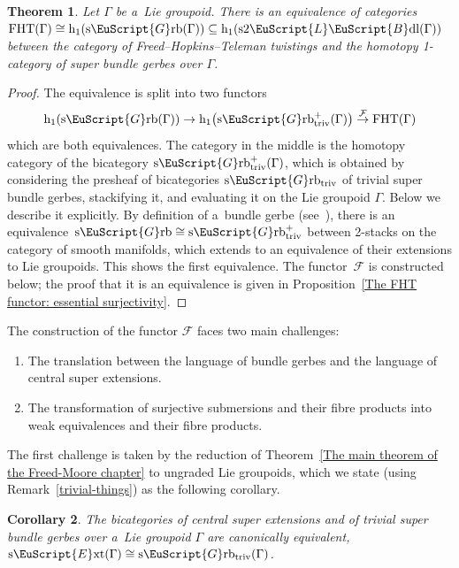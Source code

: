 \documentclass[pdftex]{sigma}
\numberwithin{equation}{section}
\newtheorem{Theorem}{Theorem}[section]
\newtheorem{Corollary}[Theorem]{Corollary}
\def\mathscr#1{\EuScript{#1}}
\def\hc#1{\mathrm{h}_{#1}}
\def\subset{\subseteq}
\newcommand{\LineBdl}{\mathscr{L}\mathscr{B}\mathrm{dl}}
\newcommand{\stwoLineBdl}{\mathrm{s}2\LineBdl}
\newcommand{\Grb}{\mathscr{G}\mathrm{rb}}
\newcommand{\Grbtriv}{\mathscr{G}\mathrm{rb}_{\mathrm{triv}}}
\newcommand{\sGrb}{\mathrm{s}\Grb}
\newcommand{\sGrbtriv}{\mathrm{s}\Grbtriv}
\def\sExt{\normalfont\text{s}\mathscr{E}\text{xt}}
\begin{document}
\begin{Theorem}
\label{The main theorem of the Freed Hopkins Teleman chapter}
 Let $\Gamma$ be a~Lie groupoid. There is an equivalence of categories
$
\mathrm{FHT}(\Gamma) \cong \hc 1(\sGrb(\Gamma))\subset \hc 1(\stwoLineBdl(\Gamma))
$
between the category of Freed--Hopkins--Teleman twistings and the homotopy 1-category of super bundle gerbes over $\Gamma$.
\end{Theorem}

\begin{proof}
The equivalence is split into two functors
\begin{equation*}
\hc 1(\sGrb(\Gamma)) \to\hc 1\bigl(\sGrbtriv^{+}(\Gamma)\bigr) \stackrel{\mathcal{F}}\to\mathrm{FHT}(\Gamma)
\end{equation*}
which are both equivalences. The category in the middle is the homotopy category of the bicategory $\sGrbtriv^{+}(\Gamma)$, which is obtained by considering the presheaf of bicategories $\sGrbtriv$ of trivial super bundle gerbes, stackifying it, and evaluating it on the Lie groupoid $\Gamma$. Below we describe it explicitly.
By definition of a~bundle gerbe (see~\cite{nikolaus2}), there is an equivalence~${
\sGrb \cong \sGrbtriv^{+}}
$
between 2-stacks on the category of smooth manifolds, which extends to an equivalence of their extensions to Lie groupoids. This shows the first equivalence. The functor~$\mathcal{F}$ is constructed below; the proof that it is an equivalence is given in Proposition~\ref{The FHT functor: essential surjectivity}.
\end{proof}

The construction of the functor $\mathcal{F}$ faces two main challenges:
\begin{enumerate}[(1)]\itemsep=0pt
\item
The translation between the language of bundle gerbes and the language of central super extensions.

\item
The transformation of surjective submersions
and their fibre products into weak equivalences and their fibre products.
\end{enumerate}
The first challenge is taken by the reduction of Theorem~\ref{The main theorem of the Freed-Moore chapter} to ungraded Lie groupoids, which we state (using Remark~\ref{trivial-things}) as the following corollary.

\begin{Corollary}
\label{central-super-extensions-and-line-2-bundles}
The bicategories of
central super extensions and of trivial super bundle gerbes over a~Lie groupoid $\Gamma$ are canonically equivalent,
$
\sExt(\Gamma) \cong \sGrbtriv(\Gamma)$.
\end{Corollary}
\end{document}
